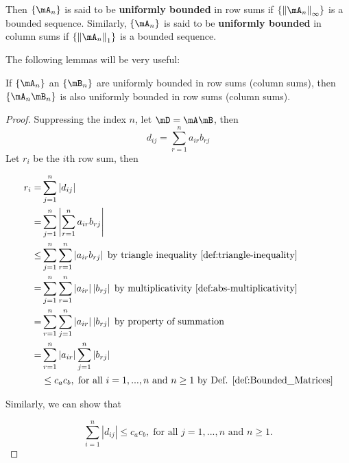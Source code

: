 \documentclass[english,12pt]{book}\usepackage[]{graphicx}\usepackage[]{xcolor}
\begin{document}
Then $\left\lbrace \mA_n \right\rbrace$ is said to be \textbf{uniformly bounded} in row sums if $\left\lbrace\left\|\mA_n\right\|_{\infty}\right\rbrace$ is a bounded sequence. Similarly, $\left\lbrace \mA_n \right\rbrace$ is said to be \textbf{uniformly bounded} in column sums if $\left\lbrace\left\|\mA_n\right\|_{1}\right\rbrace$ is a bounded sequence. 



The following lemmas will be very useful:

\begin{lemma}\label{lemma:bounded_lemma}
If $\left\lbrace \mA_n \right\rbrace$ an $\left\lbrace \mB_n \right\rbrace$ are uniformly bounded in row sums (column sums), then $\left\lbrace \mA_n \mB_n\right\rbrace$ is also uniformly bounded in row sums (column sums).
\end{lemma}

\begin{proof}
 Suppressing the index $n$, let $\mD = \mA\mB$, then
 \begin{equation}
  d_{ij} = \sum_{r = 1}^n a_{ir}b_{rj}
 \end{equation}
 Let $r_i$ be the $i$th row sum, then
 
 \begin{equation}
 \begin{aligned}
  r_i   = & \sum_{j = 1}^n \left|d_{ij}\right| \\
        = & \sum_{j = 1}^n \left|\sum_{r = 1}^n a_{ir}b_{rj}\right| \\
     \leq & \sum_{j = 1}^n \sum_{r = 1}^n \left|a_{ir}b_{rj}\right|\;\mbox{by triangle inequality \ref{def:triangle-inequality}} \\
      = & \sum_{j = 1}^n \sum_{r = 1}^n \left|a_{ir}\right|\left|b_{rj}\right|\;\mbox{by multiplicativity \ref{def:abs-multiplicativity}} \\
      = & \sum_{r = 1}^n \sum_{j = 1}^n \left|a_{ir}\right|\left|b_{rj}\right|\;\mbox{by property of summation} \\
      = & \sum_{r = 1}^n \left|a_{ir}\right| \sum_{j = 1}^n \left|b_{rj}\right| \\
        & \leq c_{a} c_{b},\; \mbox{for all $i = 1,..., n$ and $n\geq 1$ by Def. \ref{def:Bounded_Matrices}}
 \end{aligned}
 \end{equation}
 
 Similarly, we can show that 
 
 \begin{equation}
 \sum_{i = 1}^n \left|d_{ij}\right|\leq c_{a} c_{b},\; \mbox{for all $j = 1,..., n$ and $n\geq 1$.}
 \end{equation}
\end{proof}
\end{document}
